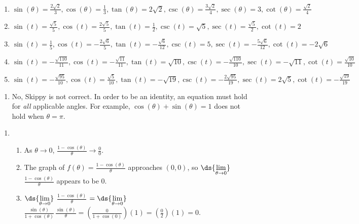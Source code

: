\documentclass{ximera}
\begin{document}
\begin{enumerate}
\item $\sin(\theta) = \frac{2\sqrt{2}}{3}, \cos(\theta) = \frac{1}{3}, \tan(\theta) = 2\sqrt{2}, \csc(\theta) = \frac{3\sqrt{2}}{4}, \sec(\theta) = 3, \cot(\theta) = \frac{\sqrt{2}}{4}$

\item $\sin(t) = \frac{\sqrt{5}}{5}, \cos(t) = \frac{2\sqrt{5}}{5}, \tan(t) = \frac{1}{2}, \csc(t) = \sqrt{5}, \sec(t) = \frac{\sqrt{5}}{2}, \cot(t) = 2$

\item $\sin(t) = \frac{1}{5}, \cos(t) = -\frac{2\sqrt{6}}{5}, \tan(t) = -\frac{\sqrt{6}}{12}, \csc(t) = 5, \sec(t) = -\frac{5\sqrt{6}}{12}, \cot(t) = -2\sqrt{6}$

\item $\sin(t) = -\frac{\sqrt{110}}{11}, \cos(t) = -\frac{\sqrt{11}}{11}, \tan(t) = \sqrt{10}, \csc(t) = -\frac{\sqrt{110}}{10}, \sec(t) = -\sqrt{11}, \cot(t) = \frac{\sqrt{10}}{10}$

\item $\sin(t) = -\frac{\sqrt{95}}{10}, \cos(t) = \frac{\sqrt{5}}{10}, \tan(t) = -\sqrt{19}, \csc(t) = -\frac{2\sqrt{95}}{19}, \sec(t) = 2\sqrt{5}, \cot(t) = -\frac{\sqrt{19}}{19}$

\setcounter{HW}{\value{enumi}}

\end{enumerate}

\begin{enumerate}
\setcounter{enumi}{\value{HW}}

\item No, Skippy is not correct.  In order to be an identity, an equation must hold for \textit{all} applicable angles.  For example,  $\cos(\theta) + \sin(\theta) = 1$ does not hold when $\theta = \pi$.  

\setcounter{HW}{\value{enumi}}
\end{enumerate}

\begin{enumerate}
\setcounter{enumi}{\value{HW}}
\addtocounter{enumi}{51}

\item  \begin{enumerate}  \item  As $\theta \rightarrow 0$,  $\frac{1 - \cos(\theta)}{\theta} \rightarrow \frac{0}{0}$.


\item  The graph of  $f(\theta) = \frac{1 - \cos(\theta)}{\theta}$ approaches $(0,0)$, so   $\ds{\lim_{\theta \rightarrow 0}}$ $\frac{1 - \cos(\theta)}{\theta}$ appears to be $0$.

\addtocounter{enumii}{1}


\item  $\ds{\lim_{\theta \rightarrow 0}}$ $\frac{1 - \cos(\theta)}{\theta}$ $= \ds{\lim_{\theta \rightarrow 0}}$ $\frac{\sin(\theta)}{1 + \cos(\theta)} \, \frac{\sin(\theta)}{\theta} = \left(\frac{0}{1+\cos(0)}\right)(1) = \left(\frac{0}{2}\right)(1) = 0$.
\end{enumerate}

\setcounter{HW}{\value{enumi}}
\end{enumerate}
\end{document}
